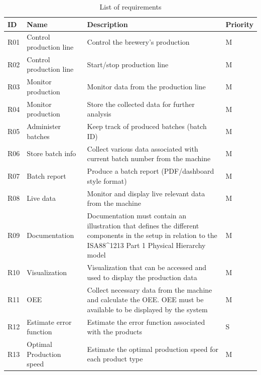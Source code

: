 \begin{table}[H]
    \begin{tabularx}{\textwidth}{|>{\RaggedRight}p{1cm}|>{\RaggedRight}p{4cm}|>{\RaggedRight}X|>{\RaggedRight}p{1cm}|}
        \hline
        \textbf{ID} & \textbf{Name} & \textbf{Description} & \textbf{Priority} \\
        \hline
        R01 & Control production line & Control the brewery's production & M \\
        \hline
        R02 & Control production line & Start/stop production line & M \\
        \hline
        R03 & Monitor production & Monitor data from the production line & M \\
        \hline
        R04 & Monitor production & Store the collected data for further analysis & M \\
        \hline
        R05 & Administer batches & Keep track of produced batches (batch ID) & M \\
        \hline
        R06 & Store batch info & Collect various data associated with current batch number from the machine & M \\
        \hline
        R07 & Batch report & Produce a batch report (PDF/dashboard style format) & M \\
        \hline
        R08 & Live data & Monitor and display live relevant data from the machine & M \\
        \hline
        R09 & Documentation & Documentation must contain an illustration that defines the different components in the setup in relation to the ISA88\^{}1213 Part 1 Physical Hierarchy model & M \\
        \hline
        R10 & Visualization & Visualization that can be accessed and used to display the production data & M \\
        \hline
        R11 & OEE & Collect necessary data from the machine and calculate the OEE. OEE must be available to be displayed by the system & M \\
        \hline
        R12 & Estimate error function & Estimate the error function associated with the products & S \\
        \hline
        R13 & Optimal Production speed & Estimate the optimal production speed for each product type & M \\
        \hline
    \end{tabularx}
    \caption{List of requirements} 
    \label{table:Requirements}
\end{table}  


